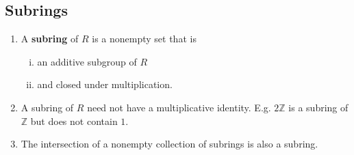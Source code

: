\subsection*{Subrings}
\begin{enumerate}[(1)]
	\item A \textbf{subring} of $R$ is a nonempty set that is
	\begin{enumerate}[(i)]
		\item an additive subgroup of $R$
		\item and closed under multiplication.
	\end{enumerate}
	\item A subring of $R$ need not have a multiplicative identity. E.g. $2\mathbb{Z}$ is a subring of $\mathbb{Z}$ but does not contain $1$.
	\item The intersection of a nonempty collection of subrings is also a subring.
\end{enumerate}